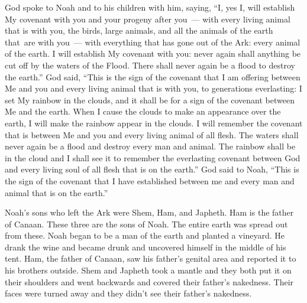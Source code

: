 \begin{inparaenum}
     God spoke to Noah and to his children with him, saying,%
     ``I, yes I, will establish My covenant with you and your progeny after you~---%
     with every living animal that is with you, the birds, large animals, and all the animals of the earth that\understood\ are with you~--- with everything that has gone out of the Ark: every animal of the earth.%
     I will establish My covenant with you: never again shall anything be cut off by the waters of the Flood. There shall never again be a flood to destroy the earth.''%
     God said, ``This is the sign of the covenant that I am offering between Me and you and every living animal that is with you, to generations everlasting:%
     I set My rainbow in the clouds, and it shall be for a sign of the covenant between Me and the earth.%
     When I cause the clouds to make an appearance over the earth, I will make the rainbow appear in the clouds.%
     I will remember the covenant that is between Me and you and every living animal of all flesh. The waters shall never again be a flood and destroy every man and animal.%
     The rainbow shall be in the cloud and I shall see it to remember the everlasting covenant between God and every living soul of all flesh that is on the earth.''%
     God said to Noah, ``This is the sign of the covenant that I have established between me and every man and animal that is on the earth.''%
    
     Noah's sons who left the Ark were Shem, Ham, and Japheth. Ham is the father of Canaan.%
     These three are the sons of Noah. The entire earth was spread out from these.%
     Noah began to be a man of the earth and planted a vineyard.%
     He drank the wine and became drunk and uncovered himself in the middle of his tent.%
     Ham, the father of Canaan, saw his father's genital area and reported it to his brothers outside.%
     Shem and Japheth took a mantle and they both put it on their shoulders and went backwards and covered their father's nakedness. Their faces were turned away and they didn't see their father's nakedness.%
    
    
\end{inparaenum}

